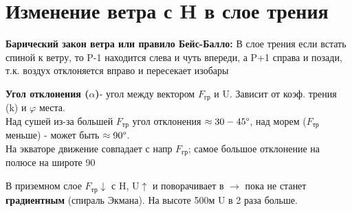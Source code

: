 

\section{Изменение ветра с H в слое трения}
\par \textbf{Барический закон ветра или правило Бейс-Балло:} В слое трения если встать спиной к ветру, то P-1 находится слева и чуть впереди, а P+1 справа и позади, т.к. воздух отклоняется вправо и пересекает изобары
\par\textbf{Угол отклонения ($\alpha$)}- угол между вектором $F_{\text{гр}}$ и U. Зависит от коэф. трения (k) и $\varphi$ места.\\
Над сушей из-за большей $F_{\text{тр}}$ угол отклонения  $\approx30-45\degree$, над морем ($F_{\text{тр}}$ меньше) - может быть $\approx90\degree$. \\
На экваторе движение совпадает с напр $F_{\text{гр}}$; самое большое отклонение на полюсе на широте 90\textdegree\\

\par В приземном слое $F_{\text{тр}}$$\downarrow$ с H, U$\uparrow$ и поворачивает в $\longrightarrow$ пока не станет \textbf{градиентным} (спираль Экмана). На высоте 500м U в 2 раза больше.
